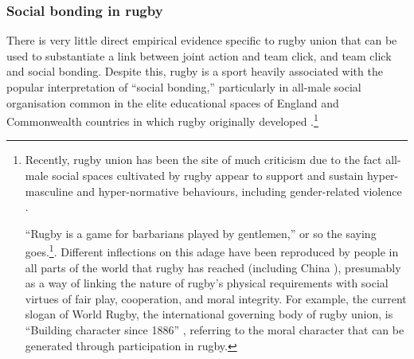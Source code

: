 \subsubsection{Social bonding in rugby}
There is very little direct empirical evidence specific to rugby union that can be used to substantiate a link between joint action and team click, and team click and social bonding.  Despite this, rugby is a sport heavily associated with the popular interpretation of ``social bonding,'' particularly in all-male social organisation common in the elite educational spaces of England and Commonwealth countries in which rugby originally developed \citep{Dunning2005,Richards2007,Collins2008}.\footnote{Recently, rugby union has been the site of much criticism due to the fact all-male social spaces cultivated by rugby appear to support and sustain hyper-masculine and hyper-normative behaviours, including gender-related violence \citep{Cosslett2014}.

``Rugby is a game for barbarians played by gentlemen,'' or so the saying goes.\footnote{The origins of this oft-cited Rugby adage is unclear.  The phrase is supposedly the adopted motto of the British Barbarians Football Club, established in 1890 \citep[34]{Dunning2005}.  The complete phrase reads ``Rugby is a game for barbarians played by gentlemen, football is a game for gentlemen played by barbarians.''  However, official club history cites its original motto as, ‘Rugby Football is a game for gentlemen in all classes, but for no bad sportsman in any class' \citep[vii]{Starmer-Smith1977}.  Some sources attribute the saying to British writer and poet Oscar Wilde (1854-1900) \citep{Fleenor2015}}. Different inflections on this adage have been reproduced by people in all parts of the world that rugby has reached (including China \cite{}), presumably as a way of linking the nature of rugby's physical requirements with social virtues of fair play, cooperation, and moral integrity. For example, the current slogan of World Rugby, the international governing body of rugby union, is ``Building character since 1886'' \citep{WorldRugby2017}, referring to the moral character that can be generated through participation in rugby.

}
